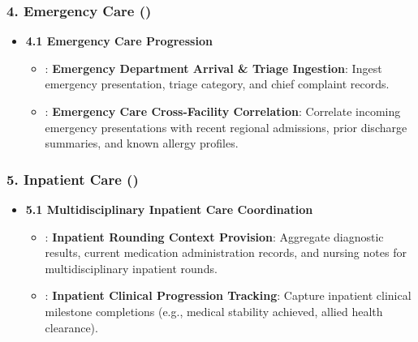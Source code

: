 \subsubsection*{4. Emergency Care (\texttt{})}
\label{rad:enabling:400}

\begin{itemize}

\item
\textbf{4.1 Emergency Care Progression}


\begin{itemize}

\item
\texttt{}: \textbf{Emergency Department Arrival \& Triage Ingestion}: Ingest emergency presentation, triage category, and chief complaint records.



\item
\texttt{}: \textbf{Emergency Care Cross-Facility Correlation}: Correlate incoming emergency presentations with recent regional admissions, prior discharge summaries, and known allergy profiles.



\end{itemize}


\end{itemize}
\label{rad:enabling:404}
\subsubsection*{5. Inpatient Care (\texttt{})}
\label{rad:enabling:405}

\begin{itemize}

\item
\textbf{5.1 Multidisciplinary Inpatient Care Coordination}


\begin{itemize}

\item
\texttt{}: \textbf{Inpatient Rounding Context Provision}: Aggregate diagnostic results, current medication administration records, and nursing notes for multidisciplinary inpatient rounds.



\item
\texttt{}: \textbf{Inpatient Clinical Progression Tracking}: Capture inpatient clinical milestone completions (e.g., medical stability achieved, allied health clearance).



\end{itemize}


\end{itemize}
\label{rad:enabling:409}
